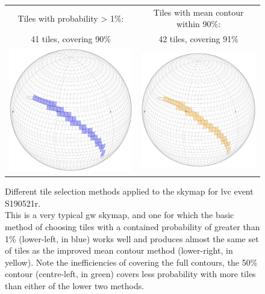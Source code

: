 \begin{colsection}
\begin{colsection}
\begin{figure}[p]
\begin{center}
\begin{tabular}{cc}
            Tiles with probability > 1\%: &
            Tiles with mean contour within 90\%: \\
            41 tiles, covering 90\% &
            42 tiles, covering 91\% \\
            \includegraphics[width=0.25\linewidth]{images/tiling/1_a.png} &
            \includegraphics[width=0.25\linewidth]{images/tiling/1_b.png} \\
        \end{tabular}
    \end{center}
    \caption[Different tile selection methods for S190521r]{
        Different tile selection methods applied to the skymap for \gls{lvc} event S190521r.\\
        This is a very typical \gls{gw} skymap, and one for which the basic method of choosing tiles with a contained probability of greater than 1\% (lower-left, in blue) works well and produces almost the same set of tiles as the improved mean contour method (lower-right, in yellow). Note the inefficiencies of covering the full contours, the 50\% contour (centre-left, in green) covers less probability with more tiles than either of the lower two methods.
    }\label{fig:tiling_S190521r}
\end{figure}

\newpage


\end{colsection}
\end{colsection}
